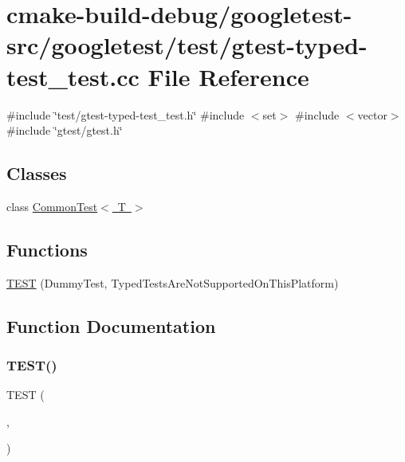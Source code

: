 \hypertarget{gtest-typed-test__test_8cc}{}\section{cmake-\/build-\/debug/googletest-\/src/googletest/test/gtest-\/typed-\/test\+\_\+test.cc File Reference}
\label{gtest-typed-test__test_8cc}
{\ttfamily \#include \char`\"{}test/gtest-\/typed-\/test\+\_\+test.\+h\char`\"{}}\newline
{\ttfamily \#include $<$set$>$}\newline
{\ttfamily \#include $<$vector$>$}\newline
{\ttfamily \#include \char`\"{}gtest/gtest.\+h\char`\"{}}\newline
\subsection*{Classes}
\begin{DoxyCompactItemize}
\item 
class \mbox{\hyperlink{classCommonTest}{Common\+Test$<$ T $>$}}
\end{DoxyCompactItemize}
\subsection*{Functions}
\begin{DoxyCompactItemize}
\item 
\mbox{\hyperlink{gtest-typed-test__test_8cc_a7d2c906b58ca05100fcea4e00858d2c6}{T\+E\+ST}} (Dummy\+Test, Typed\+Tests\+Are\+Not\+Supported\+On\+This\+Platform)
\end{DoxyCompactItemize}


\subsection{Function Documentation}
\mbox{\label{gtest-typed-test__test_8cc_a7d2c906b58ca05100fcea4e00858d2c6}} 
\subsubsection{\texorpdfstring{TEST()}{TEST()}}
{\footnotesize\ttfamily T\+E\+ST (\begin{DoxyParamCaption}\item[{Dummy\+Test}]{,  }\item[{Typed\+Tests\+Are\+Not\+Supported\+On\+This\+Platform}]{ }\end{DoxyParamCaption})}

